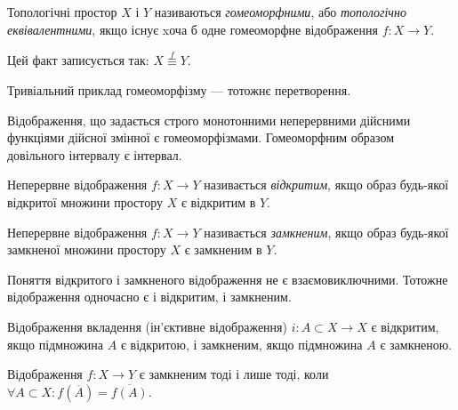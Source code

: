 \documentclass[a4paper, 12pt]{article}
\begin{document}
\begin{definition}
	Топологічні простор $X$ і $Y$ називаються
	\textit{гомеоморфними}, або \textit{топологічно еквівалентними}, якщо
	існує xоча б одне гомеоморфне відображення $f: X \to Y$.
\end{definition}

Цей факт записується так: $X \overset{f}{\equiv} Y$.

\begin{example}
	Тривіальний приклад гомеоморфізму --- тотожнє перетворення.
\end{example}

\begin{example}
	Відображення, що задається строго монотонними неперервними дійсними функціями дійсної
	змінної є гомеоморфізмами. Гомеоморфним образом довільного інтервалу є інтервал.
\end{example}

\begin{definition}
	Неперервне відображення $f: X \to Y$
	називається \textit{відкритим}, якщо образ будь-якої відкритої
	множини простору $X$ є відкритим в $Y$.
\end{definition}

\begin{definition}
	Неперервне відображення $f: X \to Y$
	називається \textit{замкненим}, якщо образ будь-якої замкненої
	множини простору $X$ є замкненим в $Y$.
\end{definition}

\begin{remark}
	Поняття відкритого і замкненого відображення не є
	взаємовиключними. Тотожне відображення одночасно є і
	відкритим, і замкненим.
\end{remark}

\begin{example}
	Відображення вкладення (ін'єктивне
	відображення) $i: A \subset X \to X$ є відкритим, якщо
	підмножина $A$ є відкритою, і замкненим, якщо підмножина
	$A$ є замкненою.
\end{example}

\begin{theorem}
	Відображення $f: X \to Y$ є замкненим тоді
	і лише тоді, коли $\forall A \subset X: f(\overline{A}) = \overline{f(A)}$.
\end{theorem}
\end{document}
